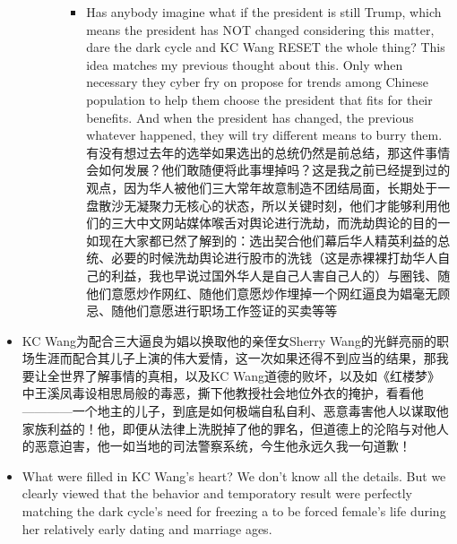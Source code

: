 \documentclass[9pt, b5paper]{article}
\begin{document}
\begin{itemize}
\begin{itemize}
\begin{itemize}
\begin{itemize}
\item Has anybody imagine what if the president is still Trump, which means the president has NOT changed considering this matter, dare the dark cycle and KC Wang RESET the whole thing? This idea matches my previous thought about this. Only when necessary they cyber fry on propose for trends among Chinese population to help them choose the president that fits for their benefits. And when the president has changed, the previous whatever happened, they will try different means to burry them. 有没有想过去年的选举如果选出的总统仍然是前总结，那这件事情会如何发展？他们敢随便将此事埋掉吗？这是我之前已经提到过的观点，因为华人被他们三大常年故意制造不团结局面，长期处于一盘散沙无凝聚力无核心的状态，所以关键时刻，他们才能够利用他们的三大中文网站媒体喉舌对舆论进行洗劫，而洗劫舆论的目的一如现在大家都已然了解到的：选出契合他们幕后华人精英利益的总统、必要的时候洗劫舆论进行股市的洗钱（这是赤裸裸打劫华人自己的利益，我也早说过国外华人是自己人害自己人的）与圈钱、随他们意愿炒作网红、随他们意愿炒作埋掉一个网红逼良为娼毫无顾忌、随他们意愿进行职场工作签证的买卖等等
\end{itemize}
\end{itemize}
\end{itemize}

\item KC Wang为配合三大逼良为娼以换取他的亲侄女Sherry Wang的光鲜亮丽的职场生涯而配合其儿子上演的伟大爱情，这一次如果还得不到应当的结果，那我要让全世界了解事情的真相，以及KC Wang道德的败坏，以及如《红楼梦》中王溪凤毒设相思局般的毒恶，撕下他教授社会地位外衣的掩护，看看他————一个地主的儿子，到底是如何极端自私自利、恶意毒害他人以谋取他家族利益的！他，即便从法律上洗脱掉了他的罪名，但道德上的沦陷与对他人的恶意迫害，他一如当地的司法警察系统，今生他永远久我一句道歉！
\item What were filled in KC Wang's heart? We don't know all the details. But we clearly viewed that the behavior and temporatory result were perfectly matching the dark cycle's need for freezing a to be forced female's life during her relatively early dating and marriage ages.


\end{itemize}
\end{document}
